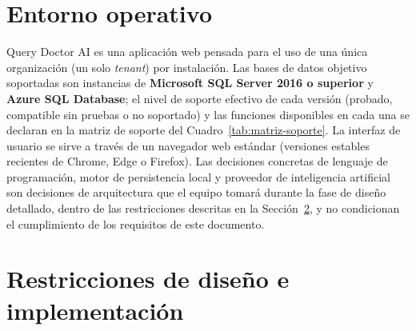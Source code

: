 \documentclass[11pt,a4paper]{report}
\begin{document}
\section{Entorno operativo}

Query Doctor AI es una aplicaci\'on web pensada para el uso de una \'unica organizaci\'on (un solo \textit{tenant}) por instalaci\'on. Las bases de datos objetivo soportadas son instancias de \textbf{Microsoft SQL Server 2016 o superior} y \textbf{Azure SQL Database}; el nivel de soporte efectivo de cada versi\'on (probado, compatible sin pruebas o no soportado) y las funciones disponibles en cada una se declaran en la matriz de soporte del Cuadro~\ref{tab:matriz-soporte}. La interfaz de usuario se sirve a trav\'es de un navegador web est\'andar (versiones estables recientes de Chrome, Edge o Firefox). Las decisiones concretas de lenguaje de programaci\'on, motor de persistencia local y proveedor de inteligencia artificial son decisiones de arquitectura que el equipo tomar\'a durante la fase de dise\~no detallado, dentro de las restricciones descritas en la Secci\'on~\ref{sec:restricciones}, y no condicionan el cumplimiento de los requisitos de este documento.

\section{Restricciones de dise\~no e implementaci\'on}
\label{sec:restricciones}
\end{document}
